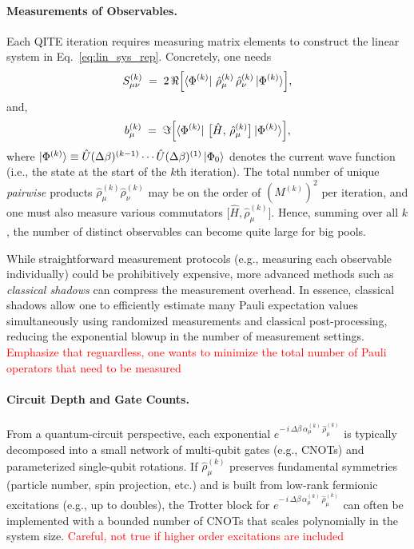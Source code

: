 \documentclass[aip,jcp,amsmath,amssymb, reprint]{revtex4-1}
\begin{document}
\paragraph{Measurements of Observables.}
Each QITE iteration requires measuring matrix elements to construct the linear system in Eq.~\eqref{eq:lin_sys_rep}. Concretely, one needs
\begin{equation}
S_{\mu \nu}^{(k)} 
\;=\; 
2 \,\Re \Bigl[ 
\bra{\Phi^{(k)}} 
\,\hat{\rho}_\mu^{(k)} \,\hat{\rho}_\nu^{(k)}
\ket{\Phi^{(k)}}
\Bigr],
\end{equation}
and,
\begin{equation}
b_{\mu}^{(k)}
\;=\;
\Im \Bigl[
\bra{\Phi^{(k)}}\,
\bigl[\hat{H},\,\hat{\rho}_\mu^{(k)}\bigr]
\ket{\Phi^{(k)}}
\Bigr],
\end{equation}
where $\ket{\Phi^{(k)}} \equiv \hat{U}(\Delta \beta)^{(k-1)} \cdots \hat{U}(\Delta \beta)^{(1)} \ket{\Phi_0}$ denotes the current wave function (i.e., the state at the start of the $k$th iteration). The total number of unique \textit{pairwise} products $\hat{\rho}_\mu^{(k)}\hat{\rho}_\nu^{(k)}$ may be on the order of $(M^{(k)})^2$ per iteration, and one must also measure various commutators $\bigl[\hat{H},\hat{\rho}_\mu^{(k)}\bigr]$. Hence, summing over all $k$, the number of distinct observables can become quite large for big pools. 

While straightforward measurement protocols (e.g., measuring each observable individually) could be prohibitively expensive, more advanced methods such as \textit{classical shadows}\cite{huang2020predicting} can compress the measurement overhead. In essence, classical shadows allow one to efficiently estimate many Pauli expectation values simultaneously using randomized measurements and classical post-processing, reducing the exponential blowup in the number of measurement settings.
\textcolor{red}{Emphasize that reguardless, one wants to minimize the total number of Pauli operators that need to be measured}

\paragraph{Circuit Depth and Gate Counts.}
From a quantum-circuit perspective, each exponential $e^{-\,i\,\Delta \beta\,\alpha_\mu^{(k)} \,\hat{\rho}_\mu^{(k)}}$ is typically decomposed into a small network of multi-qubit gates (e.g., CNOTs) and parameterized single-qubit rotations. If $\hat{\rho}_\mu^{(k)}$ preserves fundamental symmetries (particle number, spin projection, etc.) and is built from low-rank fermionic excitations (e.g., up to doubles), the Trotter block for $e^{-\,i\,\Delta \beta\,\alpha_\mu^{(k)} \,\hat{\rho}_\mu^{(k)}}$ can often be implemented with a bounded number of CNOTs that scales polynomially in the system size. 
\textcolor{red}{Careful, not true if higher order excitations are included}
\end{document}
